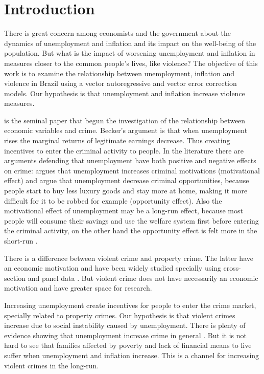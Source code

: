 \documentclass[11pt, a4paper]{article}
\begin{document}
\section{Introduction}

There is great concern among economists and the government about the dynamics of unemployment and inflation and its impact on the well-being of the population. But what is the impact of worsening unemployment and inflation in measures closer to the common people's lives, like violence?
The objective of this work is to examine the relationship between unemployment, inflation and violence in Brazil using a vector autoregressive and vector error correction  models. Our hypothesis is that unemployment and inflation increase violence measures. 

\cite{becker1968} is the seminal paper that begun the investigation of the relationship between economic variables and crime. Becker's  argument is that when unemployment rises the marginal returns of legitimate earnings decrease. Thus creating  incentives to enter the criminal activity to people. 
In the literature there are arguments defending that unemployment have both positive and negative effects on crime: \cite{becker1968} argues that unemployment increases criminal motivations (motivational effect) and \cite{cantor_land_1985} argue that unemployment decrease criminal opportunities, because people start to buy less luxury goods and stay more at home, making it more difficult for it to be robbed for example (opportunity effect). 
Also the motivational effect of unemployment may be a long-run effect, because most people will consume their savings and use the welfare system first before entering the criminal activity, on the other hand the opportunity effect is felt more in the short-run \citep{tang2009}.


There is a difference between violent crime and property crime. The latter have an economic motivation and have been widely studied specially using cross-section and panel data \citep{saridakis2004}. But violent crime does not have necessarily an economic motivation and have greater space for research.

Increasing unemployment create incentives for people to enter the crime market, specially related to property crimes. Our hypothesis is that violent crimes increase due to social instability caused by unemployment. There is plenty of evidence showing that unemployment increase crime in general \citep{saridakis2011}. But it is not hard to see that families affected by poverty and lack of financial means to live suffer when unemployment and inflation increase. This is a channel for increasing violent crimes in the long-run. 
\end{document}
